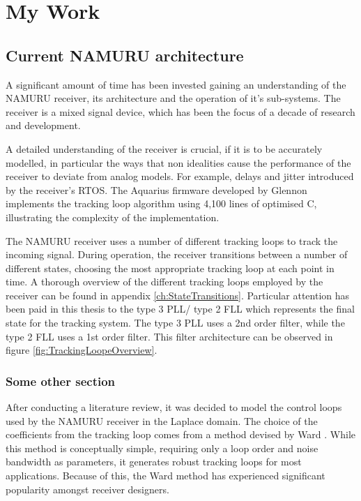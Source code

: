 \chapter{My Work}\label{ch:MyWork}

\section{Current \ac{NAMURU} architecture}
A significant amount of time has been invested gaining an understanding of the \ac{NAMURU} receiver, its architecture and the operation of it's sub-systems. The receiver is a mixed signal device, which has been the focus of a decade of research and development. 

A detailed understanding of the receiver is crucial, if it is to be accurately modelled, in particular the ways that non idealities cause the performance of the receiver to deviate from analog models. For example, delays and jitter introduced  by the receiver's \ac{RTOS}. The Aquarius firmware developed by Glennon \cite{Glennon11aquariusfirmware} implements the tracking loop algorithm using 4,100 lines of optimised C, illustrating the complexity of the implementation.

The \ac{NAMURU} receiver uses a number of different tracking loops to track the incoming signal. During operation, the receiver transitions between a number of different states, choosing the most appropriate tracking loop at each point in time. A thorough overview of the different tracking loops employed by the receiver can be found in appendix \ref{ch:StateTransitions}. Particular attention has been paid in this thesis to the type 3 PLL/ type 2 FLL which represents the final state for the tracking system. The type 3 PLL uses a 2nd order filter, while the type 2 FLL uses a 1st order filter. This filter architecture can be observed in figure \ref{fig:TrackingLoopeOverview}. 



\subsection{Some other section}

After conducting a literature review, it was decided to model the control loops used by the \ac{NAMURU} receiver in the Laplace domain. The choice of the coefficients from the tracking loop comes from a method devised by Ward \cite{Ward}. While this method is conceptually simple, requiring only a loop order and noise bandwidth as parameters, it generates robust tracking loops for most applications. Because of this, the Ward method has experienced significant popularity amongst receiver designers.  



